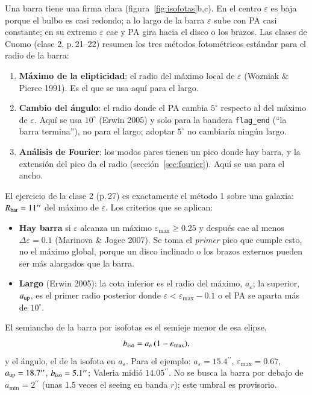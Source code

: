 \documentclass[11pt,a4paper]{article}
\newcommand{\as}{\ensuremath{^{\prime\prime}}}
\newcommand{\aeps}{a_\varepsilon}
\newcommand{\code}[1]{\texttt{#1}}
\begin{document}
Una barra tiene una firma clara (figura~\ref{fig:isofotas}b,c). En el centro $\varepsilon$ es baja porque el
bulbo es casi redondo; a lo largo de la barra $\varepsilon$ sube con PA casi constante; en su extremo
$\varepsilon$ cae y PA gira hacia el disco o los brazos. Las clases de Cuomo (clase 2, p.\,21--22) resumen los
tres métodos fotométricos estándar para el radio de la barra:
\begin{enumerate}
\item \textbf{Máximo de la elipticidad}: el radio del máximo local de $\varepsilon$ (Wozniak \& Pierce 1991). Es
el que se usa aquí para el largo.
\item \textbf{Cambio del ángulo}: el radio donde el PA cambia $5^\circ$ respecto al del máximo de
$\varepsilon$. Aquí se usa $10^\circ$ (Erwin 2005) y solo para la bandera \code{flag\_end} (``la barra termina''),
no para el largo; adoptar $5^\circ$ no cambiaría ningún largo.
\item \textbf{Análisis de Fourier}: los modos pares tienen un pico donde hay barra, y la extensión del pico da el
radio (sección~\ref{sec:fourier}). Aquí se usa para el ancho.
\end{enumerate}
El ejercicio de la clase 2 (p.\,27) es exactamente el método 1 sobre una galaxia: $R_{\rm bar} = 11\as$ del
máximo de $\varepsilon$. Los criterios que se aplican:
\begin{itemize}
\item \textbf{Hay barra} si $\varepsilon$ alcanza un máximo $\varepsilon_{\max}\ge 0.25$ y después cae al
menos $\Delta\varepsilon = 0.1$ (Marinova \& Jogee 2007). Se toma el \emph{primer} pico que cumple esto, no el
máximo global, porque un disco inclinado o los brazos externos pueden ser más alargados que la barra.
\item \textbf{Largo} (Erwin 2005): la cota inferior es el radio del máximo, $\aeps$; la superior, $a_{\rm up}$, es
el primer radio posterior donde $\varepsilon < \varepsilon_{\max} - 0.1$ o el PA se aparta más de $10^\circ$.
\end{itemize}
El semiancho de la barra por isofotas es el semieje menor de esa elipse,
\begin{equation}\label{eq:biso}
b_{\rm iso} = \aeps\,(1-\varepsilon_{\max}) ,
\end{equation}
y el ángulo, el de la isofota en $\aeps$. Para el ejemplo: $\aeps = 15.4\as$, $\varepsilon_{\max} = 0.67$,
$a_{\rm up} = 18.7\as$, $b_{\rm iso} = 5.1\as$; Valeria midió $14.05\as$. No se busca la barra por debajo de
$a_{\min} = 2\as$ (unas 1.5 veces el seeing en banda $r$); este umbral es provisorio.
\end{document}
